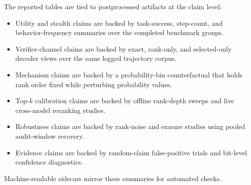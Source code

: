 \documentclass[conference,compsoc]{IEEEtran}
\begin{document}
The reported tables are tied to postprocessed artifacts at the claim level:
\begingroup
\footnotesize
\begin{itemize}[leftmargin=*]
  \item Utility and stealth claims are backed by task-success, step-count, and behavior-frequency summaries over the completed benchmark groups.
  \item Verifier-channel claims are backed by exact, rank-only, and selected-only decoder views over the same logged trajectory corpus.
  \item Mechanism claims are backed by a probability-bin counterfactual that holds rank order fixed while perturbing probability values.
  \item Top-$k$ calibration claims are backed by offline rank-depth sweeps and live cross-model reranking studies.
  \item Robustness claims are backed by rank-noise and erasure studies using pooled audit-window recovery.
  \item Evidence claims are backed by random-claim false-positive trials and bit-level confidence diagnostics.
\end{itemize}
\endgroup
Machine-readable sidecars mirror these summaries for automated checks.



\end{document}
